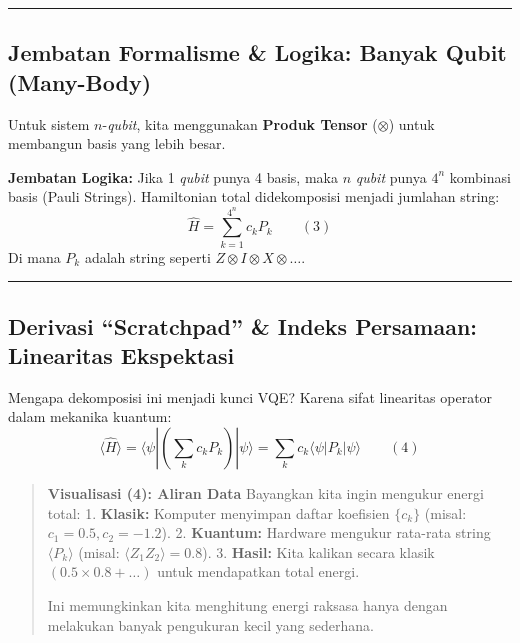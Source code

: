 \begin{center}\rule{0.5\linewidth}{0.5pt}\end{center}

\hypertarget{jembatan-formalisme-logika-banyak-qubit-many-body}{%
\subsection{Jembatan Formalisme \& Logika: Banyak Qubit (Many-Body)}\label{jembatan-formalisme-logika-banyak-qubit-many-body}}

Untuk sistem \(n\)-\emph{qubit}, kita menggunakan \textbf{Produk Tensor} (\(\otimes\)) untuk membangun basis yang lebih besar.

\textbf{Jembatan Logika:} Jika 1 \emph{qubit} punya 4 basis, maka \(n\) \emph{qubit} punya \(4^n\) kombinasi basis (Pauli Strings). Hamiltonian total didekomposisi menjadi jumlahan string: \[ \hat{H} = \sum_{k=1}^{4^n} c_k P_k \qquad (3) \] Di mana \(P_k\) adalah string seperti \(Z \otimes I \otimes X \otimes \dots\).

\begin{center}\rule{0.5\linewidth}{0.5pt}\end{center}

\hypertarget{derivasi-scratchpad-indeks-persamaan-linearitas-ekspektasi}{%
\subsection{Derivasi ``Scratchpad'' \& Indeks Persamaan: Linearitas Ekspektasi}\label{derivasi-scratchpad-indeks-persamaan-linearitas-ekspektasi}}

Mengapa dekomposisi ini menjadi kunci VQE? Karena sifat linearitas operator dalam mekanika kuantum: \[ \langle \hat{H} \rangle = \langle \psi | \left( \sum_k c_k P_k \right) | \psi \rangle = \sum_k c_k \langle \psi | P_k | \psi \rangle \qquad (4) \]

\begin{quote}
\textbf{Visualisasi (4): Aliran Data} Bayangkan kita ingin mengukur energi total: 1. \textbf{Klasik:} Komputer menyimpan daftar koefisien \(\{c_k\}\) (misal: \(c_1=0.5, c_2=-1.2\)). 2. \textbf{Kuantum:} Hardware mengukur rata-rata string \(\langle P_k \rangle\) (misal: \(\langle Z_1 Z_2 \rangle = 0.8\)). 3. \textbf{Hasil:} Kita kalikan secara klasik \((0.5 \times 0.8 + \dots)\) untuk mendapatkan total energi.

Ini memungkinkan kita menghitung energi raksasa hanya dengan melakukan banyak pengukuran kecil yang sederhana.
\end{quote}


